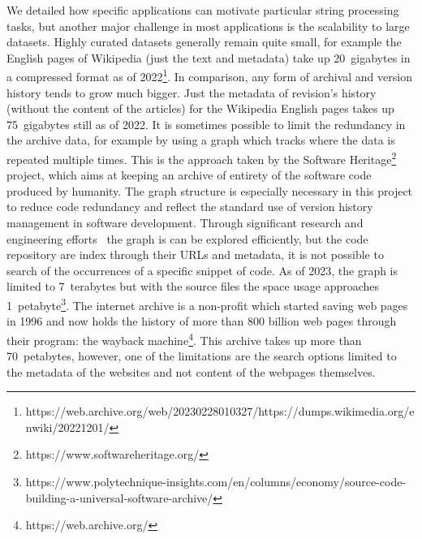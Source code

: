We detailed how specific applications can motivate particular string processing tasks, but another major challenge in most applications is the scalability to large datasets.
Highly curated datasets generally remain quite small, for example the English pages of Wikipedia (just the text and metadata) take up 20~gigabytes in a compressed format as of 2022\footnote{https://web.archive.org/web/20230228010327/https://dumps.wikimedia.org/enwiki/20221201/}. In comparison, any form of archival and version history tends to grow much bigger. Just the metadata of revision's history (without the content of the articles) for the Wikipedia English pages takes up 75~gigabytes still as of 2022.
It is sometimes possible to limit the redundancy in the archive data, for example by using a graph which tracks where the data is repeated multiple times. This is the approach taken by the Software Heritage\footnote{https://www.softwareheritage.org/} project, which aims at keeping an archive of entirety of the software code produced by humanity. The graph structure is especially necessary in this project to reduce code redundancy and reflect the standard use of version history management in software development. Through significant research and engineering efforts~\cite{DBLP:phd/hal/Pietri21} the graph is can be explored efficiently, but the code repository are index through their URLs and metadata, it is not possible to search of the occurrences of a specific snippet of code. As of 2023, the graph is limited to 7~terabytes but with the source files the space usage approaches 1~petabyte\footnote{https://www.polytechnique-insights.com/en/columns/economy/source-code-building-a-universal-software-archive/}.
The internet archive is a non-profit which started saving web pages in 1996 and now holds the history of more than 800 billion web pages through their program: the wayback machine\footnote{https://web.archive.org/}. This archive takes up more than 70~petabytes, however, one of the limitations are the search options limited to the metadata of the websites and not content of the webpages themselves.

